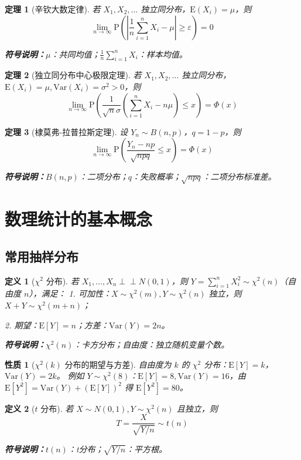 \documentclass[11pt,a4paper,oneside]{article}
\theoremstyle{yhbthm}
\newtheorem{theorem}{定理}[section]
\newtheorem{definition}{定义}[section]
\newtheorem{property}{性质}[section]
\newcommand{\E}{\mathrm{E}}
\newcommand{\D}{\mathrm{Var}}
\newcommand{\Prob}{\mathrm{P}}
\newcommand{\indep}{\perp \!\!\! \perp}
\newcommand{\symnote}[1]{\par\noindent\textbf{符号说明：}#1\par}
\begin{document}
\begin{theorem}[辛钦大数定律]
若 $X_1,X_2,\dots$ 独立同分布，$\E(X_i)=\mu$，则
$$
\lim_{n \to \infty} \Prob\left(\left|\frac{1}{n}\sum_{i=1}^n X_i - \mu\right| \ge \varepsilon\right) = 0
$$
\symnote{$\mu$：共同均值；$\frac{1}{n}\sum_{i=1}^n X_i$：样本均值。}
\end{theorem}

\begin{theorem}[独立同分布中心极限定理]
若 $X_1,X_2,\dots$ 独立同分布，$\E(X_i)=\mu, \D(X_i)=\sigma^2>0$，则
$$
\lim_{n \to \infty} \Prob\left( \frac{1}{\sqrt{n}\sigma} \left( \sum_{i=1}^n X_i - n\mu \right) \le x \right) = \Phi(x)
$$
\end{theorem}

\begin{theorem}[棣莫弗-拉普拉斯定理]
设 $Y_n \sim B(n,p)$，$q=1-p$，则
$$
\lim_{n \to \infty} \Prob\left( \frac{Y_n - np}{\sqrt{npq}} \le x \right) = \Phi(x)
$$
\symnote{$B(n,p)$：二项分布；$q$：失败概率；$\sqrt{npq}$：二项分布标准差。}
\end{theorem}

\section{数理统计的基本概念}
\subsection{常用抽样分布}
\begin{definition}[$\chi^2$ 分布]
若 $X_1,\dots,X_n \indep N(0,1)$，则 $Y = \sum_{i=1}^n X_i^2 \sim \chi^2(n)$（自由度 $n$），满足：
1. 可加性：$X \sim \chi^2(m), Y \sim \chi^2(n)$ 独立，则 $X+Y \sim \chi^2(m+n)$；

2. 期望：$\E[Y] = n$；方差：$\D(Y) = 2n$。
\symnote{$\chi^2(n)$：卡方分布；自由度：独立随机变量个数。}
\end{definition}

\begin{property}[$\chi^2(k)$ 分布的期望与方差]
自由度为 $k$ 的 $\chi^2$ 分布：$\E[Y] = k$，$\D(Y) = 2k$。
例如 $Y \sim \chi^2(8)$：$\E[Y] = 8, \D(Y) = 16$，由 $\E[Y^2] = \D(Y) + (\E[Y])^2$ 得 $\E[Y^2] = 80$。
\end{property}

\begin{definition}[$t$ 分布]
若 $X \sim N(0,1), Y \sim \chi^2(n)$ 且独立，则
$$
T = \frac{X}{\sqrt{Y/n}} \sim t(n)
$$
\symnote{$t(n)$：t分布；$\sqrt{Y/n}$：平方根。}
\end{definition}
\end{document}
